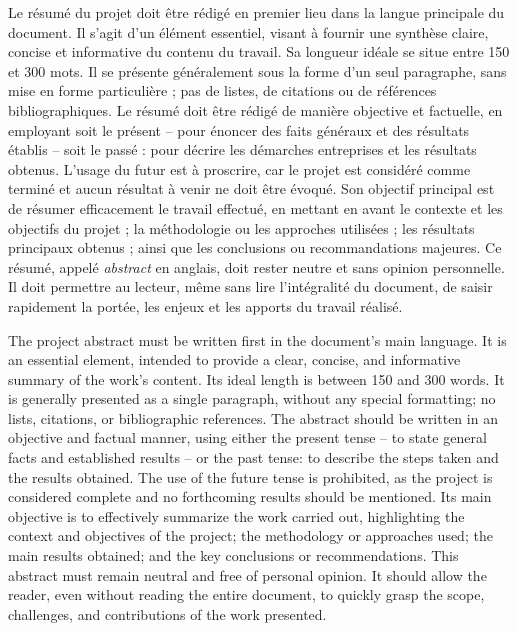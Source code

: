 Le résumé du projet doit être rédigé en premier lieu dans la langue principale du document. Il s'agit d'un élément essentiel, visant à fournir une synthèse claire, concise et informative du contenu du travail. Sa longueur idéale se situe entre 150 et 300 mots. Il se présente généralement sous la forme d'un seul paragraphe, sans mise en forme particulière ; pas de listes, de citations ou de références bibliographiques. Le résumé doit être rédigé de manière objective et factuelle, en employant soit le présent -- pour énoncer des faits généraux et des résultats établis -- soit le passé : pour décrire les démarches entreprises et les résultats obtenus. L'usage du futur est à proscrire, car le projet est considéré comme terminé et aucun résultat à venir ne doit être évoqué. Son objectif principal est de résumer efficacement le travail effectué, en mettant en avant le contexte et les objectifs du projet ; la méthodologie ou les approches utilisées ; les résultats principaux obtenus ; ainsi que les conclusions ou recommandations majeures. Ce résumé, appelé \emph{abstract} en anglais, doit rester neutre et sans opinion personnelle. Il doit permettre au lecteur, même sans lire l'intégralité du document, de saisir rapidement la portée, les enjeux et les apports du travail réalisé.

\asterism

The project abstract must be written first in the document's main language. It is an essential element, intended to provide a clear, concise, and informative summary of the work's content. Its ideal length is between 150 and 300 words. It is generally presented as a single paragraph, without any special formatting; no lists, citations, or bibliographic references. The abstract should be written in an objective and factual manner, using either the present tense -- to state general facts and established results -- or the past tense: to describe the steps taken and the results obtained. The use of the future tense is prohibited, as the project is considered complete and no forthcoming results should be mentioned. Its main objective is to effectively summarize the work carried out, highlighting the context and objectives of the project; the methodology or approaches used; the main results obtained; and the key conclusions or recommendations. This abstract must remain neutral and free of personal opinion. It should allow the reader, even without reading the entire document, to quickly grasp the scope, challenges, and contributions of the work presented.